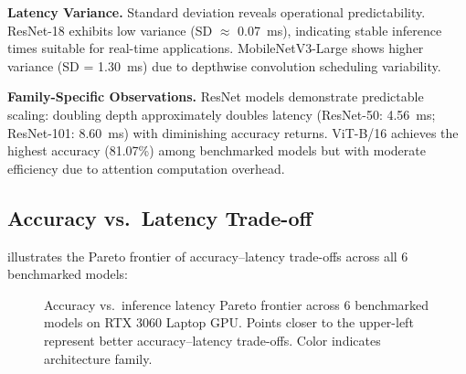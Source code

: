 \documentclass[10pt,twocolumn,a4paper]{article}
\theoremstyle{definition}
\theoremstyle{plain}
\begin{document}
\textbf{Latency Variance.} Standard deviation reveals operational predictability. ResNet-18 exhibits low variance (SD $\approx$ \SI{0.07}{\milli\second}), indicating stable inference times suitable for real-time applications. MobileNetV3-Large shows higher variance (SD = \SI{1.30}{\milli\second}) due to depthwise convolution scheduling variability.

\textbf{Family-Specific Observations.} ResNet models demonstrate predictable scaling: doubling depth approximately doubles latency (ResNet-50: \SI{4.56}{\milli\second}; ResNet-101: \SI{8.60}{\milli\second}) with diminishing accuracy returns. ViT-B/16 achieves the highest accuracy (81.07\%) among benchmarked models but with moderate efficiency due to attention computation overhead.

\subsection{Accuracy vs.\ Latency Trade-off}

 illustrates the Pareto frontier of accuracy--latency trade-offs across all 6 benchmarked models:

\begin{figure}[t]
\centering
{}
\caption{Accuracy vs.\ inference latency Pareto frontier across 6 benchmarked models on RTX 3060 Laptop GPU. Points closer to the upper-left represent better accuracy--latency trade-offs. Color indicates architecture family.}
\label{fig:pareto}
\end{figure}
\end{document}
